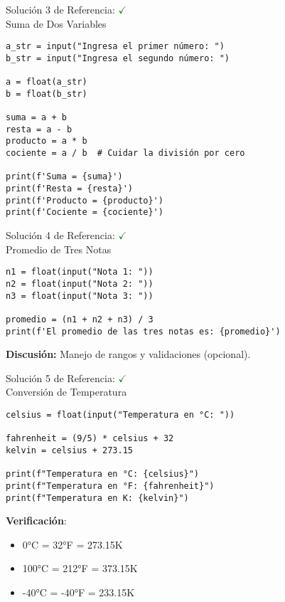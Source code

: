 \documentclass[10pt]{beamer}
\begin{document}
\begin{frame}[fragile]{Solución 3 de Referencia: \hfill \textcolor{green}{$\checkmark$} \\Suma de Dos Variables}
\begin{verbatim}
a_str = input("Ingresa el primer número: ")
b_str = input("Ingresa el segundo número: ")

a = float(a_str)
b = float(b_str)

suma = a + b
resta = a - b
producto = a * b
cociente = a / b  # Cuidar la división por cero

print(f'Suma = {suma}')
print(f'Resta = {resta}')
print(f'Producto = {producto}')
print(f'Cociente = {cociente}')
\end{verbatim}
\end{frame}

\begin{frame}[fragile]{Solución 4 de Referencia: \hfill \textcolor{green}{$\checkmark$} \\Promedio de Tres Notas}
\begin{verbatim}
n1 = float(input("Nota 1: "))
n2 = float(input("Nota 2: "))
n3 = float(input("Nota 3: "))

promedio = (n1 + n2 + n3) / 3
print(f'El promedio de las tres notas es: {promedio}')
\end{verbatim}
\textbf{Discusión:} Manejo de rangos y validaciones (opcional).
\end{frame}

\begin{frame}[fragile]{Solución 5 de Referencia: \hfill \textcolor{green}{$\checkmark$} \\ Conversión de Temperatura}
\begin{verbatim}
celsius = float(input("Temperatura en °C: "))

fahrenheit = (9/5) * celsius + 32
kelvin = celsius + 273.15

print(f"Temperatura en °C: {celsius}")
print(f"Temperatura en °F: {fahrenheit}")
print(f"Temperatura en K: {kelvin}")
\end{verbatim}

\textbf{Verificación}:
\begin{itemize}
  \item 0°C = 32°F = 273.15K
  \item 100°C = 212°F = 373.15K
  \item -40°C = -40°F = 233.15K
\end{itemize}
\end{frame}
\end{document}
